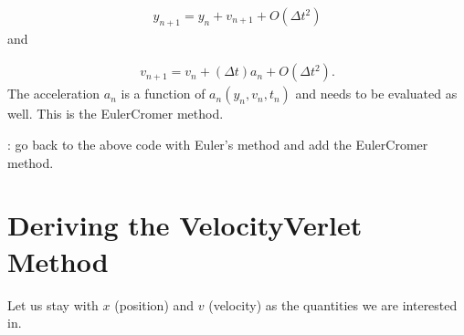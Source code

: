 \documentclass[letterpaper,10pt,english]{sphinxmanual}
\begin{document}
\begin{equation*}
\begin{split}
\begin{equation} 
y_{n+1}=y_{n}+ v_{n+1}+O(\Delta t^2)
\label{_auto35} \tag{39}
\end{equation}
\end{split}
\end{equation*}
and




\begin{equation*}
\begin{split}
\begin{equation}
v_{n+1}=v_{n}+(\Delta t) a_{n}+O(\Delta t^2).
\label{_auto36} \tag{40}
\end{equation}
\end{split}
\end{equation*}
The acceleration \(a_n\) is a function of \(a_n(y_n, v_n, t_n)\) and needs to be evaluated
as well. This is the Euler\sphinxhyphen{}Cromer method.

: go back to the above code with Euler’s method and add the Euler\sphinxhyphen{}Cromer method.


\section{Deriving the Velocity\sphinxhyphen{}Verlet Method}
\label{\detokenize{chapter1:deriving-the-velocity-verlet-method}}
Let us stay with \(x\) (position) and \(v\) (velocity) as the quantities we are interested in.
\end{document}
